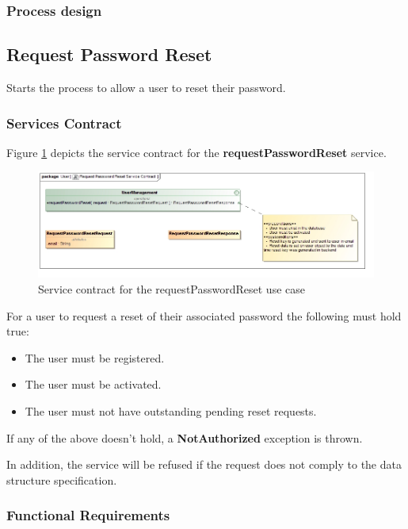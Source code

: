 \subsubsection{Process design}

\subsection{Request Password Reset}
Starts the process to allow a user to reset their password.

\subsubsection{Services Contract}
Figure \ref{fig:requestPasswordResetServicesContract} depicts the service contract for the \textbf{requestPasswordReset} service.

\begin{figure}[H]
  \begin{center}
  \includegraphics[scale=0.55]{../Diagrams and Charts/Users/Request Password Reset Service Contract.jpg}
  \caption{Service contract for the requestPasswordReset use case}
  \end{center}
  \label{fig:requestPasswordResetServicesContract}
\end{figure}

For a user to request a reset of their associated password the following must hold true:
\begin{itemize}
	\item The user must be registered.
	\item The user must be activated.
	\item The user must not have outstanding pending reset requests.
\end{itemize}

If any of the above doesn't hold, a \textbf{NotAuthorized} exception is thrown.

In addition, the service will be refused if the request does not comply to the data structure specification.

\subsubsection{Functional Requirements}


